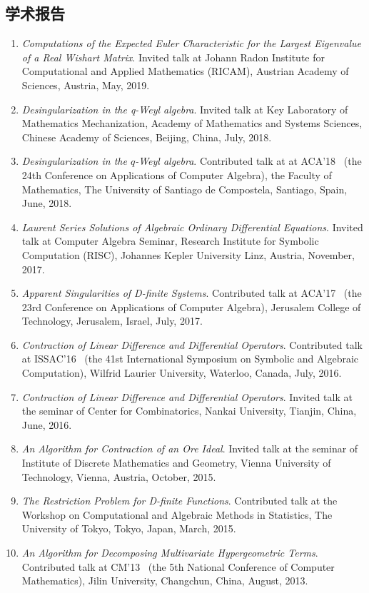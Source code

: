 \documentclass[a4paper,12pt]{article}
\begin{document}
\begin{CJK*}{UTF8}{gbsn}
\section*{\Large{学术报告}}
\begin{enumerate}
\item {\em Computations of the Expected Euler Characteristic for the Largest Eigenvalue of a Real Wishart Matrix}.
Invited talk at Johann Radon Institute for Computational and Applied Mathematics (RICAM), Austrian Academy of Sciences, 
Austria, May, 2019.
 \item {\em Desingularization in the q-Weyl algebra}. 
 Invited talk at Key Laboratory of Mathematics Mechanization, Academy of Mathematics and Systems Sciences,
 Chinese Academy of Sciences, Beijing, China, July, 2018. 
\item {\em Desingularization in the $q$-Weyl algebra}. 
 Contributed talk at at ACA'18 
 \ (the 24th Conference on Applications of Computer Algebra), the Faculty of Mathematics, 
 The University of Santiago de Compostela, Santiago, Spain, June, 2018.
 \item {\em Laurent Series Solutions of Algebraic Ordinary Differential Equations}. 
 Invited talk at Computer Algebra Seminar, Research Institute for Symbolic Computation (RISC), Johannes Kepler University Linz, 
 Austria, November, 2017.
 \item {\em Apparent Singularities of D-finite Systems}. Contributed talk at ACA'17 
 \ (the 23rd Conference on Applications of Computer Algebra), Jerusalem College of Technology, Jerusalem, Israel, July, 2017.
 \item {\em Contraction of Linear Difference and Differential Operators}. Contributed talk at ISSAC'16 
 \ (the 41st International Symposium on Symbolic and Algebraic Computation), Wilfrid Laurier University, Waterloo, Canada, July, 2016.
 \item {\em Contraction of Linear Difference and Differential Operators}.
       Invited talk at the seminar of Center for Combinatorics, Nankai University, Tianjin, China, June, 2016.
 \item {\em An Algorithm for Contraction of an Ore Ideal}. Invited talk at the seminar of Institute of Discrete Mathematics and Geometry, 
       Vienna University of Technology, Vienna, Austria, October, 2015.
 \item {\em The Restriction Problem for D-finite Functions}. 
       Contributed talk at the Workshop on Computational and Algebraic Methods in Statistics,
       The University of Tokyo, Tokyo, Japan, March, 2015.
 \item {\em An Algorithm for Decomposing Multivariate Hypergeometric Terms}. Contributed talk at CM'13
       \ (the 5th National Conference of Computer Mathematics), Jilin University, Changchun, China, August, 2013.
\end{enumerate}


\end{CJK*}
\end{document}
